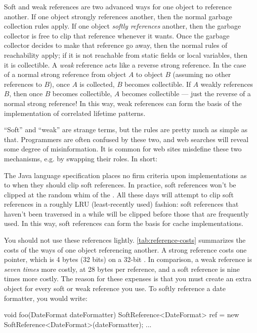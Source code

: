 Soft and weak references are two advanced ways for one object to reference
another. If one object strongly references another, then the normal garbage
collection rules apply. If one object \emph{softly references} another, then
the garbage collector is free to clip that reference whenever it wants. Once the
garbage collector decides to make that reference go away, then the normal rules
of reachability apply; if it is not reachable from static fields or local
variables, then it is collectible.
A \emph{weak} reference acts like a reverse strong reference. In the case of a
normal strong reference from object $A$ to object $B$ (assuming no other
references to $B$), once $A$ is collected, $B$ becomes collectible. If $A$
weakly references $B$, then once $B$ becomes collectible, $A$ becomes
collectible --- just the reverse of a normal strong reference! In this way, weak
references can form the basis of the implementation of correlated lifetime
patterns.

``Soft'' and ``weak'' are strange terms, but the rules are pretty much as simple
as that. Programmers are often confused by these two, and web searches will
reveal some degree of misinformation. It is common for web sites misdefine
these two mechanisms, e.g. by swapping their roles. In short:

 
The Java language specification places no firm criteria upon \jre
implementations as to when they should clip soft references. In practice, soft
references won't be clipped at the random whim of the \jre. All \jres these days
will attempt to clip soft references in a roughly LRU (least-recently used)
fashion: soft references that haven't been traversed in a while will be clipped
before those that are frequently used. In this way, soft references can form the
basis for cache implementations.

You should not use these references lightly. \autoref{tab:reference-costs}
summarizes the costs of the ways of one object referencing another. A strong
reference costs one pointer, which is 4 bytes (32 bits) on a 32-bit \jre. In
comparison, a weak reference is \emph{seven times} more costly, at 28 bytes per
reference, and a soft reference is nine times more costly. The reason for these
expenses is that you must create an extra  object for
every soft or weak reference you use. To softly reference a date formatter,
you would write:
\begin{shortlisting}
void foo(DateFormat dateFormatter) {
   SoftReference<DateFormat> ref = new SoftReference<DateFormat>(dateFormatter);
   ...
}
\end{shortlisting}

